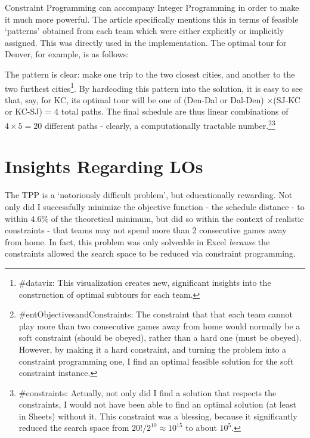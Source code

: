\documentclass[twoside]{article}
\begin{document}
Constraint Programming can accompany Integer Programming in order to make it much more powerful. The article specifically mentions this in terms of feasible `patterns' obtained from each team which were either explicitly or implicitly assigned. This was directly used in the implementation. The optimal tour for Denver, for example, is as follows:\\
\begin{figure}[h!]

\begin{center} 
\end{center} 
\end{figure}

The pattern is clear: make one trip to the two closest cities, and another to the two furthest cities\footnote{\#dataviz: This visualization creates new, significant insights into the construction of optimal subtours for each team.}. By hardcoding this pattern into the solution, it is easy to see that, say, for KC, its optimal tour will be one of (Den-Dal or Dal-Den) $\times$(SJ-KC or KC-SJ) = 4 total paths. The final schedule are thus linear combinations of $4\times5=20$ different paths - clearly, a computationally tractable number.\footnote{\#entObjectivesandConstraints: The constraint that that each team cannot play more than two consecutive games away from home would normally be a soft constraint (should be obeyed), rather than a hard one (must be obeyed). However, by making it a hard constraint, and turning the problem into a constraint programming one, I find an optimal feasible solution for the soft constraint instance.}\footnote{\#constraints: Actually, not only did I find a solution that respects the constraints, I would not have been able to find an optimal solution (at least in Sheets) without it. This constraint was a blessing, because it significantly reduced the search space from $20!/2^{10} \approx 10^{15}$ to about $10^{5}$.}

\section*{Insights Regarding LOs}
The TPP is a `notoriously difficult problem', but educationally rewarding. Not only did I successfully minimize the objective function - the schedule distance -  to within 4.6\% of the theoretical minimum, but did so within the context of realistic constraints - that teams may not spend more than 2 consecutive games away from home. In fact, this problem was only solveable in Excel \textit{because} the constraints allowed the search space to be reduced via constraint programming.\\ 
\end{document}
